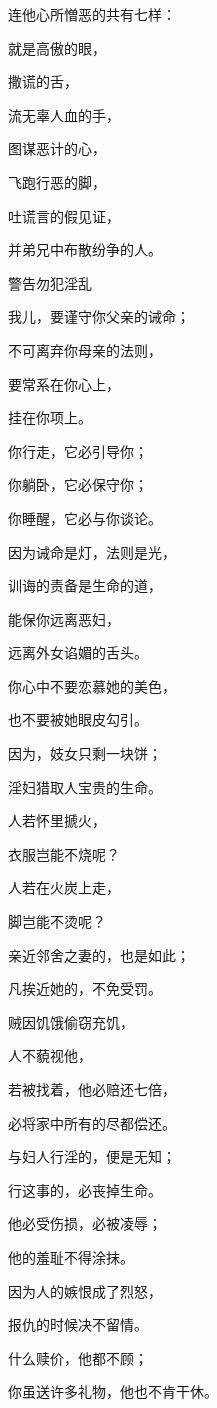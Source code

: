 {\par }{\Q 连他心所憎恶的共有七样：
\par }{\Q {}就是高傲的眼，
\par }{\Q 撒谎的舌，
\par }{\Q 流无辜人血的手，
\par }{\Q {}图谋恶计的心，
\par }{\Q 飞跑行恶的脚，
\par }{\Q {}吐谎言的假见证，
\par }{\Q 并弟兄中布散纷争的人。
\par }{\SH 警告勿犯淫乱
\par }{\Q {}我儿，要谨守你父亲的诫命；
\par }{\Q 不可离弃你母亲的法则，
\par }{\Q {}要常系在你心上，
\par }{\Q 挂在你项上。
\par }{\Q {}你行走，它必引导你；
\par }{\Q 你躺卧，它必保守你；
\par }{\Q 你睡醒，它必与你谈论。
\par }{\Q {}因为诫命是灯，法则是光，
\par }{\Q 训诲的责备是生命的道，
\par }{\Q {}能保你远离恶妇，
\par }{\Q 远离外女谄媚的舌头。
\par }{\Q {}你心中不要恋慕她的美色，
\par }{\Q 也不要被她眼皮勾引。
\par }{\Q {}因为，妓女{}只剩一块饼；
\par }{\Q 淫妇猎取人宝贵的生命。
\par }{\Q {}人若怀里搋火，
\par }{\Q 衣服岂能不烧呢？
\par }{\Q {}人若在火炭上走，
\par }{\Q 脚岂能不烫呢？
\par }{\Q {}亲近邻舍之妻的，也是如此；
\par }{\Q 凡挨近她的，不免受罚。
\par }{\Q {}贼因饥饿偷窃充饥，
\par }{\Q 人不藐视他，
\par }{\Q {}若被找着，他必赔还七倍，
\par }{\Q 必将家中所有的尽都偿还。
\par }{\Q {}与妇人行淫的，便是无知；
\par }{\Q 行这事的，必丧掉生命。
\par }{\Q {}他必受伤损，必被凌辱；
\par }{\Q 他的羞耻不得涂抹。
\par }{\Q {}因为人的嫉恨成了烈怒，
\par }{\Q 报仇的时候决不留情。
\par }{\Q {}什么赎价，他都不顾；
\par }{\Q 你虽送许多礼物，他也不肯干休。

}
